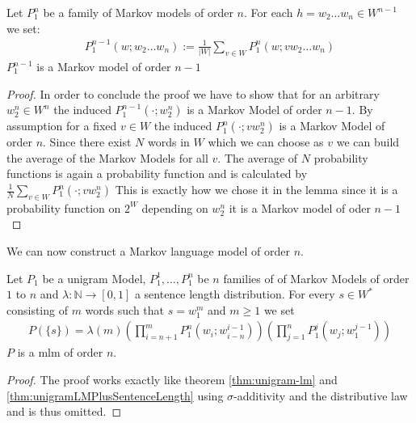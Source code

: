 \documentclass[•]{book}
\begin{document}
\begin{lemma}\label{lem:constructLowerOrderMarkovFamilies}
Let $P_1^n$ be a family of Markov models of order $n$.  
For each $h=w_2\dots w_n\in W^{n-1}$ we set: 
\begin{align}
P_1^{n-1}(w;w_2\dots w_n):=\frac{1}{|W|}\sum_{v\in W}P_1^n(w;v w_2\dots w_n)
\end{align}
$P_1^{n-1}$ is a Markov model of order $n-1$ 
\begin{proof}
In order to conclude the proof we have to show that for an arbitrary $w_2^{n}\in W^{n}$ the induced $P_1^{n-1}(\cdot;w_2^n)$ is a Markov Model of order $n-1$.
By assumption for a fixed $v\in W$ the induced $P_1^n(\cdot ; vw_2^n)$ is a Markov Model of order $n$. 
Since there exist $N$ words in $W$ which we can choose as $v$ we can build the average of the Markov Models for all $v$. 
The average of $N$ probability functions is again a probability function  and is calculated by $\frac{1}{N}\sum_{v\in W}P_1^n(\cdot;vw_2^n)$ This is exactly how we chose it in the lemma since it is a probability function on $2^W$ depending on $w_2^n$ it is a Markov model of oder $n-1$
\end{proof}
\end{lemma}

We can now construct a Markov language model of order $n$.

\begin{theorem}\label{thm:markovModelOrderN}
Let $P_1$ be a unigram Model, $P_1^1,\dots,P_1^n$ be $n$ families of of Markov Models of order $1$ to $n$ and $\lambda:\mathbb{N}\longrightarrow [0,1]$ a  sentence length distribution. For every $s\in W^{*}$ consisting of $m$ words such that $s=w_1^m$ and $m\geq 1$ we set
\begin{align}
P(\{s\})=\lambda(m)\left(\prod_{i=n+1}^mP_1^n(w_i;w_{i-n}^{i-1})\right)\left(\prod_{j=1}^nP_1^{j}(w_j;w_1^{j-1})\right)\label{formula:MarkovLMOrderN}
\end{align}
$P$ is a \gls{mlm} of order $n$.
\begin{proof}
The proof works exactly like theorem \ref{thm:unigram-lm} and \ref{thm:unigramLMPlusSentenceLength} using $\sigma$-additivity and the distributive law and is thus omitted. 
\end{proof}
\end{theorem}
\end{document}
